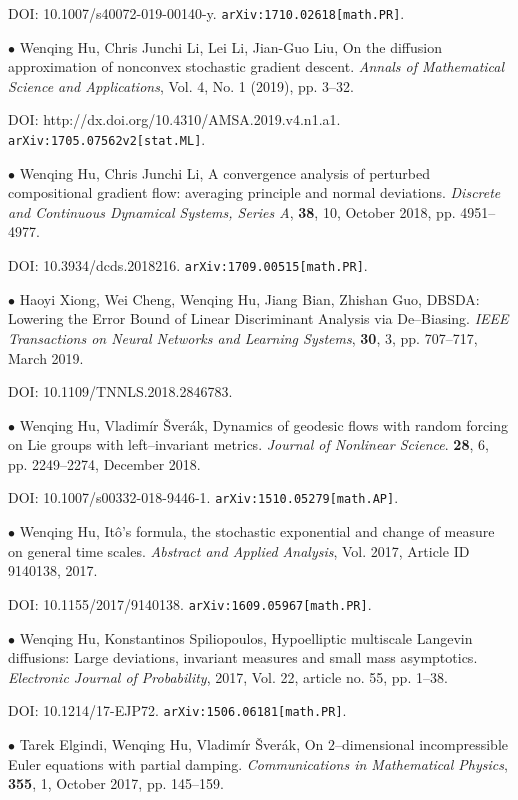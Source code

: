 \documentclass[margin,line]{res}
\begin{document}
\begin{resume}
DOI: 10.1007/s40072-019-00140-y. \verb"arXiv:1710.02618[math.PR]".


$\bullet$ Wenqing Hu, Chris Junchi Li, Lei Li, Jian-Guo Liu, On the diffusion approximation of nonconvex stochastic gradient descent.
\textit{Annals of Mathematical Science and Applications}, Vol. 4, No. 1 (2019), pp. 3--32.

DOI: http://dx.doi.org/10.4310/AMSA.2019.v4.n1.a1. \verb"arXiv:1705.07562v2[stat.ML]".


$\bullet$ Wenqing Hu, Chris Junchi Li,
A convergence analysis of perturbed compositional gradient flow: averaging principle and normal deviations.
\textit{Discrete and Continuous Dynamical Systems, Series A}, \textbf{38}, 10, October 2018, pp. 4951--4977.

DOI: 10.3934/dcds.2018216. \verb"arXiv:1709.00515[math.PR]".


$\bullet$ Haoyi Xiong, Wei Cheng, Wenqing Hu, Jiang Bian, Zhishan Guo,
DBSDA: Lowering the Error Bound of Linear Discriminant Analysis via De--Biasing.
\textit{IEEE Transactions on Neural Networks and Learning Systems}, \textbf{30}, 3, pp. 707--717, March 2019.

DOI: 10.1109/TNNLS.2018.2846783.

$\bullet$ Wenqing Hu, Vladim\'{i}r \v{S}ver\'{a}k, Dynamics of
geodesic flows with random forcing on Lie groups with
left--invariant metrics. \textit{Journal of Nonlinear Science}. \textbf{28}, 6, pp. 2249--2274, December 2018.

DOI: 10.1007/s00332-018-9446-1. \verb"arXiv:1510.05279[math.AP]".


$\bullet$ Wenqing Hu, It\^{o}'s formula, the stochastic exponential and change of
measure on general time scales. \textit{Abstract and Applied Analysis},
Vol. 2017, Article ID 9140138, 2017. 

DOI: 10.1155/2017/9140138. \verb"arXiv:1609.05967[math.PR]".


$\bullet$ Wenqing Hu, Konstantinos Spiliopoulos, Hypoelliptic
multiscale Langevin diffusions: Large deviations, invariant measures
and small mass asymptotics. \textit{Electronic Journal of Probability}, 2017, Vol. 22,
article no. 55, pp. 1--38. 

DOI: 10.1214/17-EJP72. \verb"arXiv:1506.06181[math.PR]".


$\bullet$ Tarek Elgindi, Wenqing Hu, Vladim\'{i}r \v{S}ver\'{a}k, On
$2$--dimensional incompressible Euler equations with partial
damping. \textit{Communications in Mathematical Physics}, \textbf{355}, 1, October 2017, pp. 145--159. 


\end{resume}
\end{document}
